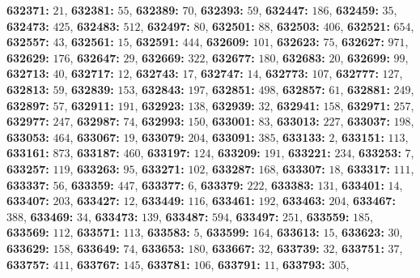 \textsf{\bfseries 632371:} $21$, \textsf{\bfseries 632381:} $55$, \textsf{\bfseries 632389:} $70$, \textsf{\bfseries 632393:} $59$, \textsf{\bfseries 632447:} $186$, \textsf{\bfseries 632459:} $35$, \textsf{\bfseries 632473:} $425$, \textsf{\bfseries 632483:} $512$, \textsf{\bfseries 632497:} $80$, \textsf{\bfseries 632501:} $88$, \textsf{\bfseries 632503:} $406$, \textsf{\bfseries 632521:} $654$, \textsf{\bfseries 632557:} $43$, \textsf{\bfseries 632561:} $15$, \textsf{\bfseries 632591:} $444$, \textsf{\bfseries 632609:} $101$, \textsf{\bfseries 632623:} $75$, \textsf{\bfseries 632627:} $971$, \textsf{\bfseries 632629:} $176$, \textsf{\bfseries 632647:} $29$, \textsf{\bfseries 632669:} $322$, \textsf{\bfseries 632677:} $180$, \textsf{\bfseries 632683:} $20$, \textsf{\bfseries 632699:} $99$, \textsf{\bfseries 632713:} $40$, \textsf{\bfseries 632717:} $12$, \textsf{\bfseries 632743:} $17$, \textsf{\bfseries 632747:} $14$, \textsf{\bfseries 632773:} $107$, \textsf{\bfseries 632777:} $127$, \textsf{\bfseries 632813:} $59$, \textsf{\bfseries 632839:} $153$, \textsf{\bfseries 632843:} $197$, \textsf{\bfseries 632851:} $498$, \textsf{\bfseries 632857:} $61$, \textsf{\bfseries 632881:} $249$, \textsf{\bfseries 632897:} $57$, \textsf{\bfseries 632911:} $191$, \textsf{\bfseries 632923:} $138$, \textsf{\bfseries 632939:} $32$, \textsf{\bfseries 632941:} $158$, \textsf{\bfseries 632971:} $257$, \textsf{\bfseries 632977:} $247$, \textsf{\bfseries 632987:} $74$, \textsf{\bfseries 632993:} $150$, \textsf{\bfseries 633001:} $83$, \textsf{\bfseries 633013:} $227$, \textsf{\bfseries 633037:} $198$, \textsf{\bfseries 633053:} $464$, \textsf{\bfseries 633067:} $19$, \textsf{\bfseries 633079:} $204$, \textsf{\bfseries 633091:} $385$, \textsf{\bfseries 633133:} $2$, \textsf{\bfseries 633151:} $113$, \textsf{\bfseries 633161:} $873$, \textsf{\bfseries 633187:} $460$, \textsf{\bfseries 633197:} $124$, \textsf{\bfseries 633209:} $191$, \textsf{\bfseries 633221:} $234$, \textsf{\bfseries 633253:} $7$, \textsf{\bfseries 633257:} $119$, \textsf{\bfseries 633263:} $95$, \textsf{\bfseries 633271:} $102$, \textsf{\bfseries 633287:} $168$, \textsf{\bfseries 633307:} $18$, \textsf{\bfseries 633317:} $111$, \textsf{\bfseries 633337:} $56$, \textsf{\bfseries 633359:} $447$, \textsf{\bfseries 633377:} $6$, \textsf{\bfseries 633379:} $222$, \textsf{\bfseries 633383:} $131$, \textsf{\bfseries 633401:} $14$, \textsf{\bfseries 633407:} $203$, \textsf{\bfseries 633427:} $12$, \textsf{\bfseries 633449:} $116$, \textsf{\bfseries 633461:} $192$, \textsf{\bfseries 633463:} $204$, \textsf{\bfseries 633467:} $388$, \textsf{\bfseries 633469:} $34$, \textsf{\bfseries 633473:} $139$, \textsf{\bfseries 633487:} $594$, \textsf{\bfseries 633497:} $251$, \textsf{\bfseries 633559:} $185$, \textsf{\bfseries 633569:} $112$, \textsf{\bfseries 633571:} $113$, \textsf{\bfseries 633583:} $5$, \textsf{\bfseries 633599:} $164$, \textsf{\bfseries 633613:} $15$, \textsf{\bfseries 633623:} $30$, \textsf{\bfseries 633629:} $158$, \textsf{\bfseries 633649:} $74$, \textsf{\bfseries 633653:} $180$, \textsf{\bfseries 633667:} $32$, \textsf{\bfseries 633739:} $32$, \textsf{\bfseries 633751:} $37$, \textsf{\bfseries 633757:} $411$, \textsf{\bfseries 633767:} $145$, \textsf{\bfseries 633781:} $106$, \textsf{\bfseries 633791:} $11$, \textsf{\bfseries 633793:} $305$, 
